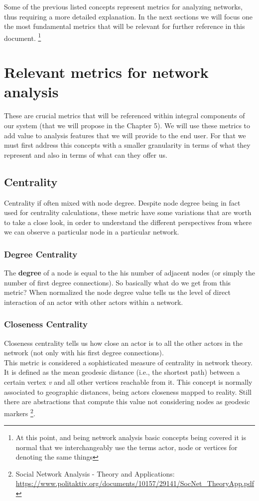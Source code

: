 Some of the previous listed concepts represent metrics for analyzing networks, thus requiring a more detailed explanation. In the next sections we will focus one the most fundamental metrics that will be relevant for further reference in this document. \footnote{At this point, and being network analysis basic concepts being covered it is normal that we interchangeably use the terms actor, node or vertices for denoting the same things}

\section{Relevant metrics for network analysis}
These are crucial metrics that will be referenced within integral components of our system (that we will propose in the Chapter 5). We will use these metrics to add value to analysis features that we will provide to the end user. For that we must first address this concepts with a smaller granularity in terms of
what they represent and also in terms of what can they offer us.

\subsection{Centrality}
Centrality if often mixed with node degree. Despite node degree being in fact used for centrality calculations, these metric have some variations
that are worth to take a close look, in order to understand the different perspectives from where we can observe a particular node in a particular network.

\subsubsection*{Degree Centrality}
The \textbf{degree} of a node is equal to the his number of adjacent nodes (or simply the number of first degree connections).
So basically what do we get from this metric? When normalized the node degree value tells us the level of direct interaction of an actor with other
actors within a network.

\subsubsection*{Closeness Centrality}
Closeness centrality tells us how close an actor is to all the other actors in the network (not only with his first degree connections).\\
\indent This metric is considered a sophisticated measure of centrality in network theory. It is defined as the mean geodesic distance
(i.e., the shortest path) between a certain vertex \textit{v} and all other vertices reachable from it. This concept is normally associated to geographic distances, being actors closeness mapped to reality. Still there are abstractions that compute
this value not considering nodes as geodesic markers \footnote{Social Network Analysis - Theory and Applications: \url{https://www.politaktiv.org/documents/10157/29141/SocNet_TheoryApp.pdf}}.

